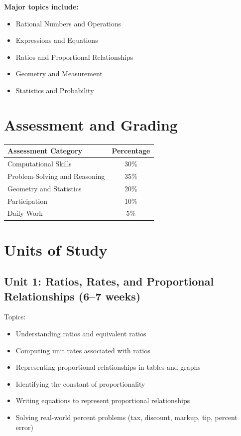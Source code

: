 \documentclass[11pt,letterpaper]{report}
\begin{document}
\textbf{Major topics include:}
\begin{itemize}
    \item Rational Numbers and Operations
    \item Expressions and Equations
    \item Ratios and Proportional Relationships
    \item Geometry and Measurement
    \item Statistics and Probability
\end{itemize}

\section{Assessment and Grading}

\begin{center}
\begin{tabular}{|l|c|}
\hline
\textbf{Assessment Category} & \textbf{Percentage} \\
\hline
Computational Skills & 30\% \\
\hline
Problem-Solving and Reasoning & 35\% \\
\hline
Geometry and Statistics & 20\% \\
\hline
Participation & 10\% \\
\hline
Daily Work & 5\% \\
\hline
\end{tabular}
\end{center}

\section{Units of Study}

\subsection{Unit 1: Ratios, Rates, and Proportional Relationships (6–7 weeks)}

Topics:
\begin{itemize}
\item Understanding ratios and equivalent ratios
\item Computing unit rates associated with ratios
\item Representing proportional relationships in tables and graphs
\item Identifying the constant of proportionality
\item Writing equations to represent proportional relationships
\item Solving real-world percent problems (tax, discount, markup, tip, percent error)
\end{itemize}
\end{document}
